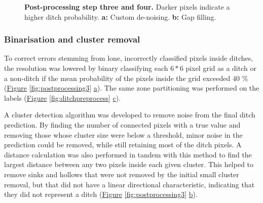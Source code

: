 \documentclass[11pt, review]{elsarticle} %
\begin{document}
\begin{figure} [!htb]
{        }
    \caption{\textbf{Post-processing step three and four.} Darker pixels indicate a higher ditch probability. \textbf{a: }Custom de-noising. \textbf{b: }Gap filling.}
    \label{fig:postprocessing2}
\end{figure}

\subsubsection{Binarisation and cluster removal}

To correct errors stemming from lone, incorrectly classified pixels inside ditches, the resolution was lowered by binary classifying each $6*6$ pixel grid as a ditch or a non-ditch if the mean probability of the pixels inside the grid exceeded 40 \% (\hyperref[fig:postprocessing3]{Figure} \ref{fig:postprocessing3} \hyperref[fig:postprocessing3]{a}). The same zone partitioning was performed on the labels (\hyperref[fig:ditchpreprocess]{Figure} \ref{fig:ditchpreprocess} \hyperref[fig:ditchpreprocess]{c}).

A cluster detection algorithm was developed to remove noise from the final ditch prediction. By finding the number of connected pixels with a true value and removing those whose cluster size were below a threshold, minor noise in the prediction could be removed, while still retaining most of the ditch pixels. A distance calculation was also performed in tandem with this method to find the largest distance between any two pixels inside each given cluster. This helped to remove sinks and hollows that were not removed by the initial small cluster removal, but that did not have a linear directional characteristic, indicating that they did not represent a ditch (\hyperref[fig:postprocessing3]{Figure} \ref{fig:postprocessing3} \hyperref[fig:postprocessing3]{b}).
\end{document}
